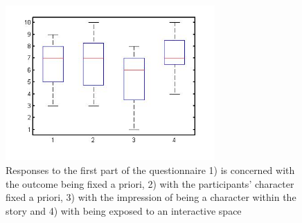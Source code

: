 \documentclass[
		twoside,openright,titlepage,numbers=noenddot,manychapters,
		headinclude,%
                footinclude=false,cleardoublepage=empty,
                BCOR=5mm,
		fontsize=11pt, %
                 enabledeprecatedfontcommands]{scrreprt}
\begin{document}
\begin{figure}[!h]
\begin{center}
\includegraphics[width=8cm]{figures/story_in_vr_pics/story_questions.jpg}
\caption{Responses to the first part of the questionnaire 1) is concerned with the outcome being fixed a priori, 2) with the participants’ character fixed a priori, 3) with the impression of being a character within the story and 4) with being exposed to an interactive space}
\label{fig_s_answers}
\end{center}
\end{figure} 
\end{document}

